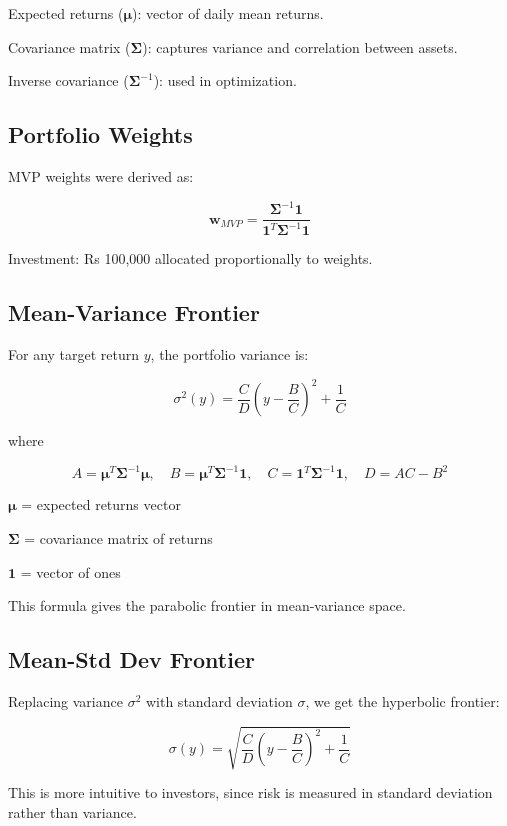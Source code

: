 \documentclass[12pt]{article}
\begin{document}
Expected returns ($\boldsymbol{\mu}$): vector of daily mean returns.

Covariance matrix ($\boldsymbol{\Sigma}$): captures variance and correlation between assets.

Inverse covariance ($\boldsymbol{\Sigma}^{-1}$): used in optimization.

\subsection{Portfolio Weights}

MVP weights were derived as:

\[
\mathbf{w}_{MVP} = \frac{\boldsymbol{\Sigma}^{-1} \mathbf{1}}{\mathbf{1}^T \boldsymbol{\Sigma}^{-1} \mathbf{1}}
\]

Investment: Rs 100,000 allocated proportionally to weights.

\subsection{Mean-Variance Frontier}

For any target return $y$, the portfolio variance is:

\[
\sigma^2(y) = \frac{C}{D}\left(y - \frac{B}{C}\right)^2 + \frac{1}{C}
\]

where

\[
A = \boldsymbol{\mu}^T \boldsymbol{\Sigma}^{-1} \boldsymbol{\mu}, \quad
B = \boldsymbol{\mu}^T \boldsymbol{\Sigma}^{-1} \mathbf{1}, \quad
C = \mathbf{1}^T \boldsymbol{\Sigma}^{-1} \mathbf{1}, \quad
D = AC - B^2
\]

$\boldsymbol{\mu}$ = expected returns vector

$\boldsymbol{\Sigma}$ = covariance matrix of returns

$\mathbf{1}$ = vector of ones

This formula gives the parabolic frontier in mean-variance space.

\subsection{Mean-Std Dev Frontier}

Replacing variance $\sigma^2$ with standard deviation $\sigma$, we get the hyperbolic frontier:

\[
\sigma(y) = \sqrt{\frac{C}{D}\left(y - \frac{B}{C}\right)^2 + \frac{1}{C}}
\]

This is more intuitive to investors, since risk is measured in standard deviation rather than variance.
\end{document}

